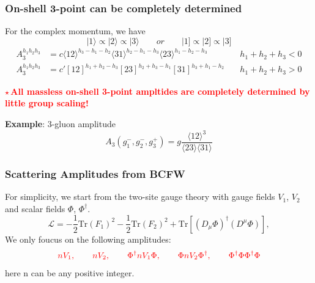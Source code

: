 \documentclass{beamer}
\newcommand{\aket}[1]{|#1\rangle}
\newcommand{\sket}[1]{|#1]}
\newcommand{\avg}[1]{\langle #1 \rangle}
\begin{document}
\begin{frame}
    \frametitle{ On-shell 3-point can be completely determined}
    For the complex momentum, we have 
    \begin{equation*}
        \aket{1}\propto \aket{2}\propto \aket{3} \qquad or \qquad \sket{1}\propto \sket{2}\propto \sket{3}
    \end{equation*}
    \[
    \boxed{
    \begin{aligned}
        A_3^{h_1h_2h_3} &= c\avg{12}^{h_3-h_1-h_2}\avg{31}^{h_2-h_1-h_3}\avg{23}^{h_1-h_2-h_3}
        \quad & h_1+h_2+h_3 < 0 \\[0.5em]
        A_3^{h_1h_2h_3} &= c' [12]^{h_1+h_2-h_3}[23]^{h_2+h_3-h_1}[31]^{h_3+h_1-h_2}
        \quad & h_1+h_2+h_3 > 0
    \end{aligned}
        }
    \]

    \textbf{\textcolor{red}{$\star$\,All massless on-shell 3-point ampltides are completely determined by little group scaling!}}
    
    \textbf{Example}: 3-gluon amplitude\\
    \begin{equation*}
        A_3(g_1^-,g_2^-,g_3^+)=g\frac{\avg{12}^3}{\avg{23}\!\avg{31}}
    \end{equation*}
\end{frame}

\begin{frame}
    \frametitle{Scattering Amplitudes from BCFW}
    For simplicity, we start from the two-site gauge theory with gauge fields $V_1$, $V_2$ and scalar fields $\Phi$, $\Phi^\dagger$.
    \begin{equation*}
        \mathcal{L}=-\frac{1}{2}\mathrm{Tr}(F_1)^2-\frac{1}{2}\mathrm{Tr}(F_2)^2+\mathrm{Tr}[(D_\mu\Phi)^\dagger(D^\mu\Phi)],
    \end{equation*}
We only foucus on the following amplitudes:
\begin{equation*}
    \textcolor{red}{nV_1,\qquad nV_2,\qquad\Phi^\dagger nV_1 \Phi,\qquad \Phi nV_2 \Phi^\dagger,\qquad \Phi^\dagger \Phi\Phi^\dagger \Phi}
\end{equation*}
here n can be any positive integer.
\end{frame}
\end{document}

